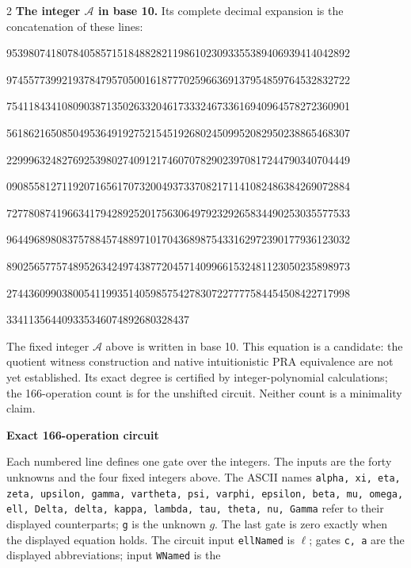 \documentclass[10pt]{article}
\begin{document}
\begin{multicols}{2}
\textbf{The integer $\mathcal A$ in base 10.}
Its complete decimal expansion is the concatenation of these lines:\par
\begingroup\fontsize{7.7}{8.2}\selectfont{}\par
95398074180784058571518488282119861023093355389406939414042892\par
97455773992193784795705001618777025966369137954859764532832722\par
75411843410809038713502633204617333246733616940964578272360901\par
56186216508504953649192752154519268024509952082950238865468307\par
22999632482769253980274091217460707829023970817244790340704449\par
09085581271192071656170732004937337082171141082486384269072884\par
72778087419663417942892520175630649792329265834490253035577533\par
96449689808375788457488971017043689875433162972390177936123032\par
89025657757489526342497438772045714099661532481123050235898973\par
27443609903800541199351405985754278307227777584454508422717998\par
334113564409335346074892680328437\par
\endgroup
\normalfont\fontsize{7.7}{8.2}\selectfont
The fixed integer $\mathcal A$ above is written in base 10. This equation is a candidate: the quotient witness construction and native
intuitionistic PRA equivalence are not yet established. Its exact degree is certified by integer-polynomial calculations;
the 166-operation count is for the unshifted circuit. Neither count is a
minimality claim.
\end{multicols}
\clearpage
\begin{center}{\large\bfseries Exact 166-operation circuit}\end{center}
Each numbered line defines one gate over the integers. The inputs are the
forty unknowns and the four fixed integers above. The ASCII names
\texttt{alpha, xi, eta, zeta, upsilon, gamma, vartheta, psi, varphi, epsilon, beta, mu, omega, ell, Delta, delta, kappa, lambda, tau, theta, nu, Gamma}
refer to their displayed counterparts; \texttt{g} is the unknown $g$. The last
gate is zero exactly when the displayed equation holds. The circuit input
\texttt{ellNamed} is $\ell$; gates \texttt{c, a} are the displayed abbreviations; input \texttt{WNamed} is the
\end{document}
